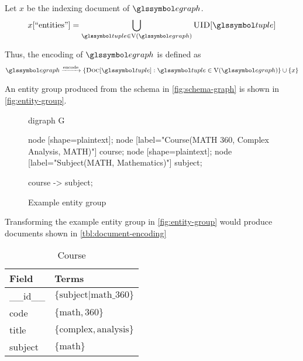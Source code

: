 		Let \(x\) be the indexing document of \(\egraph\).
		\begin{align}
			x[\text{``entities''}] = \bigcup_{\tuple \in \text{V}\left(\egraph\right)} \uid{\tuple}
		\end{align}
		
		Thus, the encoding of \(\egraph\) is defined as
		\begin{align}
			\egraph \xrightarrow{\text{encode}} \{\docs{\tuple} : \tuple \in \text{V}(\egraph)\} \cup \{x\}
		\end{align}
		
		\begin{ex}
			An entity group produced from the schema in \vref{fig:schema-graph} is shown in \vref{fig:entity-group}.
			
			\begin{figure}[H]
				\centering
				
				\begin{dot2tex}[dot]
					digraph G {
						node [shape=plaintext]; {node [label="Course(MATH 360, Complex Analysis, MATH)"] course;}
						node [shape=plaintext]; {node [label="Subject(MATH, Mathematics)"] subject;}
						
						course -> subject;
					}
				\end{dot2tex}
				
				\caption{Example entity group}
				\label{fig:entity-group}
			\end{figure}
			
			Transforming the example entity group in \vref{fig:entity-group} would produce documents shown in \vref{tbl:document-encoding}
			
			\begin{table}[H]
				\begin{subtable}[b]{0.33\linewidth}
					\centering
					
					\begin{tabular}{ll}
						\toprule
						Field & Terms \\
						\midrule
						\_\_id\_\_ & \(\{\text{subject|math\_360}\}\) \\
						code & \(\{\text{math}, \text{360}\}\) \\
						title & \(\{\text{complex}, \text{analysis}\}\) \\
						subject & \(\{\text{math}\}\) \\
						\bottomrule
					\end{tabular}
					
					\caption{Course}
				\end{subtable}
				\begin{subtable}[b]{0.33\linewidth}
					\centering
					

\end{subtable}
\end{table}
\end{ex}
